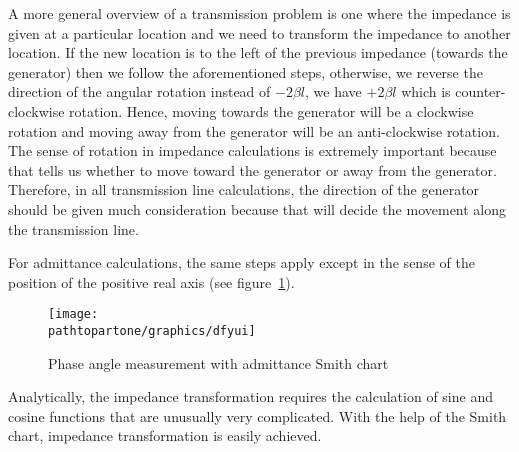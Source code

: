 A more general overview of a transmission problem is one where the impedance is given at a particular location and we need to transform the impedance to another location. If the new location is to the left of the previous impedance (towards the generator) then we follow the aforementioned steps, otherwise, we reverse the direction of the angular rotation instead of $-2\beta{l}$, we have $+2\beta{l}$ which is counter-clockwise rotation. Hence, moving towards the generator will be a clockwise rotation and moving away from the generator will be an anti-clockwise rotation. The sense of rotation in impedance calculations is extremely important because that tells us whether to move toward the generator or away from the generator. Therefore, in all transmission line calculations, the direction of the generator should be given much consideration because that will decide the movement along the transmission line.

For admittance calculations, the same steps apply except in the sense of the position of the positive real axis (see figure~\ref{fig:dfyui}).
\begin{figure}[h]
\centering
\texttt{[image: \\pathtopartone/graphics/dfyui]}
\caption{Phase angle measurement with admittance Smith chart}
\label{fig:dfyui}
\end{figure}

Analytically, the impedance transformation requires the calculation of sine and cosine functions that are unusually very complicated. With the help of the Smith chart, impedance transformation is easily achieved.

